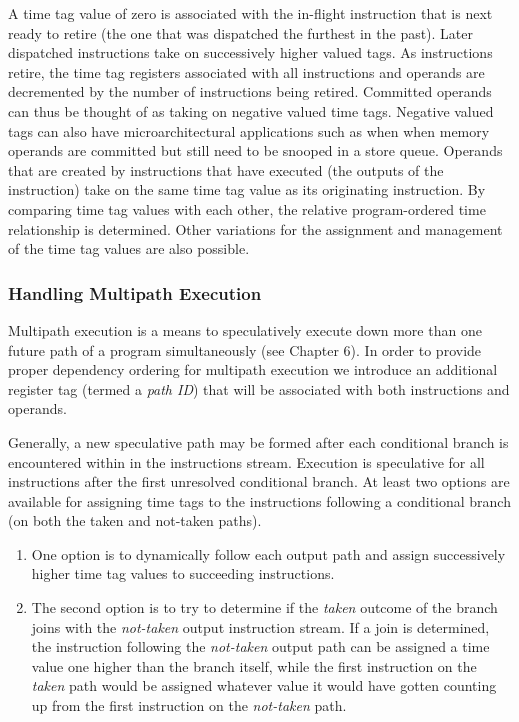 \documentclass{book}
\begin{document}
A time tag value of zero is associated with the
in-flight instruction that is next ready
to retire (the one that was dispatched the furthest in the past).
Later dispatched instructions take on successively higher
valued tags.
As instructions retire, the time tag registers associated
with all instructions and operands
are decremented by the
number of instructions being retired.
Committed operands can thus be thought of as taking on
negative valued time tags.  Negative valued tags can also have
microarchitectural applications such as when
when memory operands are committed but
still need to be snooped in a store queue.
Operands that are created by instructions that have executed
(the outputs of the instruction) take on
the same time tag value as its originating instruction.  
By comparing time tag values with each other, the relative
program-ordered time relationship is determined.
Other variations for the assignment and management of the
time tag values are also possible.
%
%
\subsubsection{Handling Multipath Execution}
%
Multipath execution is a means to speculatively
execute down more than one future path of a program simultaneously
(see Chapter 6).
In order to provide proper dependency ordering for
multipath execution we introduce an additional register tag 
(termed a \textit{path ID})
that will be associated with both instructions and operands.

Generally, a new speculative path may be formed
after each conditional branch is encountered within
in the instructions stream.  Execution is
speculative for all instructions after
the first unresolved conditional branch.
At least two options are available for assigning time tags
to the instructions following a conditional branch
(on both the taken and not-taken paths). 
%
\begin{enumerate}
\item 
One option is to dynamically follow
each output path and assign successively higher time tag values
to succeeding instructions.
%
\item 
The second option is to try to determine if the \textit{taken} outcome
of the branch joins with the \textit{not-taken} output instruction
stream.  If a join is determined, the instruction following
the \textit{not-taken} output path can be assigned a time value
one higher than the branch itself, while the first instruction
on the \textit{taken} path would be assigned whatever value
it would have gotten counting up from the first instruction
on the \textit{not-taken} path.
\end{enumerate}
\end{document}

